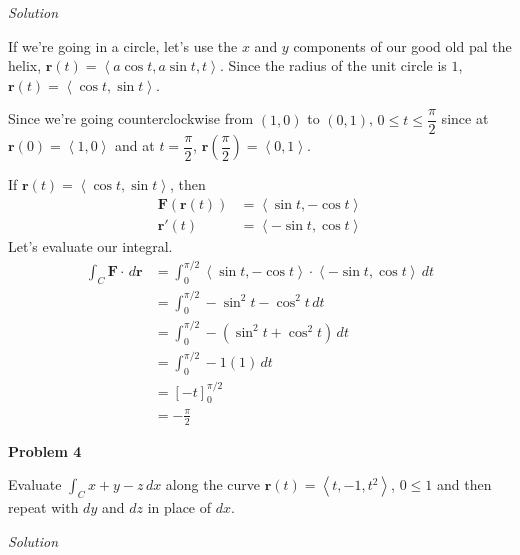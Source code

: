\documentclass{article}
\newcommand{\lrp}[1]{\left( #1 \right)}
\newcommand{\lra}[1]{\left\langle #1 \right\rangle}
\newcommand{\lrb}[1]{\left[ #1 \right]}
\renewcommand{\r}[0]{\mathbf{r}}
\newcommand{\F}[0]{\mathbf{F}}
\newcommand{\Solution}{\textit{Solution}}
\begin{document}
\Solution

If we're going in a circle, let's use the $x$ and $y$ components of our good old pal the helix, $\r(t)=\lra{a \cos t,a\sin t, t}$. Since the radius of the unit circle is $1$, $\r(t)=\lra{\cos t, \sin t}$.

Since we're going counterclockwise from $(1,0)$ to $(0,1)$, $0\leq t\leq \dfrac{\pi}{2}$ since at $\r(0)=\lra{1,0}$ and at $t=\dfrac{\pi}{2}$, $\r\lrp{\dfrac{\pi}{2}}=\lra{0,1}$.

If $\r(t)=\lra{\cos t,\sin t}$, then
\begin{align*}
    \F\lrp{\r(t)}&=\lra{\sin t, -\cos t}\\
    \r'(t)&=\lra{-\sin t,\cos t}
\end{align*}
Let's evaluate our integral.
\begin{align*}
    \int_C \F\cdot\,d\r&=\int_0^{\pi/2}\lra{\sin t, -\cos t}\cdot\lra{-\sin t,\cos t}\,dt\\
    &=\int_0^{\pi/2} -\sin^2 t -\cos ^2 t\,dt\\
    &=\int_0^{\pi/2}-(\sin^2 t +\cos^2 t)\,dt\\
    &= \int_0^{\pi/2}-1(1)\,dt\tag{$\sin^2 t + \cos^2 t = 1$}\\
    &=\lrb{-t}_0^{\pi/2}\\
    &=\boxed{-\frac{\pi}{2}}
\end{align*}
{}\textbf{Problem 4}

Evaluate $\displaystyle \int_C x+y-z\,dx$ along the curve $\r(t)=\lra{t,-1,t^2}$, $0\leq 1$ and then repeat with $dy$ and $dz$ in place of $dx$.

\Solution
\end{document}
